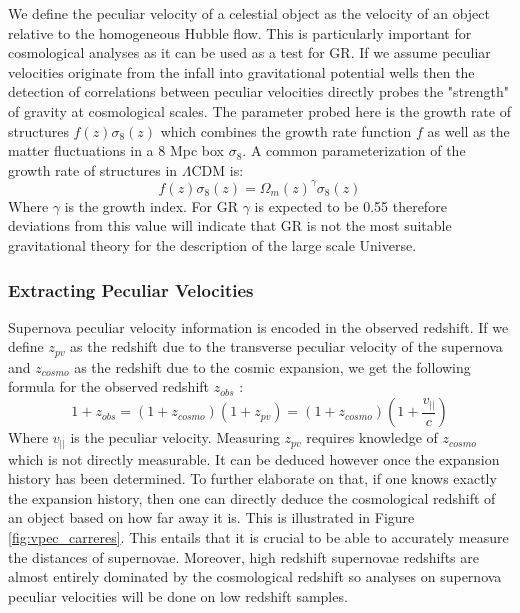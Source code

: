 We define the peculiar velocity of a celestial object as the velocity of an object relative to the homogeneous Hubble flow. This is particularly important for 
cosmological analyses as it can be used as a test for GR. If we assume peculiar velocities originate from the infall into gravitational potential wells then the detection 
of correlations between peculiar velocities directly probes the "strength" of gravity at cosmological scales. The parameter probed here is the growth rate of structures 
$f(z)\sigma_8(z)$ which combines the growth rate function $f$ as well as the matter fluctuations in a 8 Mpc box $\sigma_8$. A common parameterization of the growth rate 
of structures in $\Lambda$CDM is:
\begin{equation}
    f(z)\sigma_8(z) = \Omega_m(z)^{\gamma} \sigma_8(z)
\end{equation}
Where $\gamma$ is the growth index. For GR $\gamma$ is expected to be 0.55 therefore deviations from this value will indicate that GR is not the most suitable gravitational 
theory for the description of the large scale Universe. \\

\subsubsection{Extracting Peculiar Velocities}

Supernova peculiar velocity information is encoded in the observed redshift. If we define $z_{pv}$ as the redshift due to the transverse peculiar velocity of the supernova 
and $z_{cosmo}$ as the redshift due to the cosmic expansion, we get the following formula for the observed redshift $z_{obs}$ : 
\begin{equation}
    1+z_{obs} = (1+z_{cosmo})(1+z_{pv}) = (1+z_{cosmo})(1+\frac{v_{||}}{c})
\end{equation}
Where $v_{||}$ is the peculiar velocity. Measuring $z_{pv}$ requires knowledge of $z_{cosmo}$ which is not directly measurable. It can be deduced however once the expansion history 
has been determined. To further elaborate on that, if one knows exactly the expansion history, then one can directly deduce the cosmological redshift of an object based on how far away it is. This is illustrated in Figure \ref{fig:vpec_carreres}. 
This entails that it is crucial to be able to accurately measure the distances of supernovae. Moreover, high redshift supernovae redshifts are almost entirely dominated by 
the cosmological redshift so analyses on supernova peculiar velocities will be done on low redshift samples. \\

